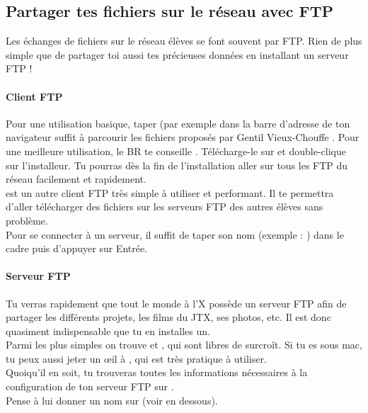 \subsection{Partager tes fichiers sur le r\'eseau avec FTP}

Les \'echanges de fichiers sur le r\'eseau \'el\`eves se font souvent par FTP. Rien de plus simple que de partager toi aussi tes pr\'ecieuses donn\'ees en installant un serveur FTP !

\paragraph{Client FTP}
Pour une utilisation basique, taper   (par exemple  dans la barre d'adresse de ton navigateur suffit \`a parcourir les fichiers propos\'es par \og Gentil Vieux-Chouffe \fg.
Pour une meilleure utilisation, le BR te conseille . T\'el\'echarge-le sur  et double-clique sur l'installeur.
Tu pourras d\`es la fin de l'installation aller sur tous les FTP du r\'eseau facilement et rapidement.\\
  est un autre client FTP tr\`es simple \`a  utiliser et performant. Il te permettra d'aller t\'el\'echarger des fichiers sur les serveurs FTP des autres \'el\`eves sans probl\`eme.\\
Pour se connecter \`a  un serveur, il suffit de taper son nom (exemple : ) dans le cadre  puis d'appuyer sur Entr\'ee.\\


\paragraph{Serveur FTP}
Tu verras rapidement que tout le monde \`a  l'X poss\`ede un serveur FTP
afin de partager les diff\'erents projets, les films du JTX, ses
photos, etc. Il est donc quasiment indispensable que tu en installes un.\\

Parmi les plus simples on trouve  et , qui sont libres de surcro\^{i}t.
Si tu es sous mac, tu peux aussi jeter un \oe{}il à , qui est très pratique à utiliser.\\
Quoiqu'il en soit, tu trouveras toutes les informations n\'ecessaires \`a la configuration de ton serveur FTP sur .\\
Pense \`a lui donner un nom sur  (voir en dessous).
